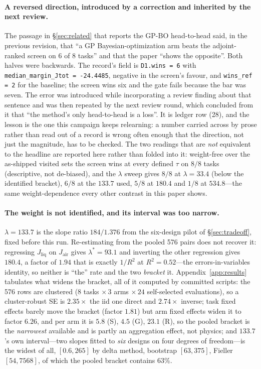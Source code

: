 \documentclass{article}
\newcommand{\Jliq}{J_{\mathrm{liq}}}
\newcommand{\Jair}{J_{\mathrm{air}}}
\begin{document}
\paragraph{A reversed direction, introduced by a correction and inherited by the next
review.}
The passage in \S\ref{sec:related} that reports the GP-BO head-to-head said, in the
previous revision, that ``a GP Bayesian-optimization arm beats the adjoint-ranked screen on
$6$ of $8$ tasks'' and that the paper ``shows the opposite''.  Both halves were backwards.
The record's field is \texttt{D1.wins = 6} with \texttt{median\_margin\_Jtot = -24.4485},
negative in the screen's favour, and \texttt{wins\_ref = 2} for the baseline; the screen
wins six and the gate fails because the bar was seven.  The error was introduced while
incorporating a review finding about that sentence and was then repeated by the next review
round, which concluded from it that ``the method's only head-to-head is a loss''.  It is
ledger row (28), and the lesson is the one this campaign keeps relearning: a number carried
across by prose rather than read out of a record is wrong often enough that the direction,
not just the magnitude, has to be checked.  The two readings that are \emph{not} equivalent
to the headline are reported here rather than folded into it: weight-free over the
as-shipped visited sets the screen wins at every defined $\tau$ on $8/8$ tasks (descriptive,
not de-biased), and the $\lambda$ sweep gives $8/8$ at $\lambda = 33.4$ (below the
identified bracket), $6/8$ at the $133.7$ used, $5/8$ at $180.4$ and $1/8$ at $534.8$---the
same weight-dependence every other contrast in this paper shows.



\paragraph{The weight is not identified, and its interval was too narrow.}
$\lambda = 133.7$ is the slope ratio $184/1.376$ from the six-design pilot of
\S\ref{sec:tradeoff}, fixed before this run.  Re-estimating from the pooled 576 pairs
does not recover it: regressing $\Jliq$ on $\Jair$ gives $\lambda^* = 93.1$ and inverting
the other regression gives $180.4$, a factor of $1.94$ that is exactly $1/R^2$ at
$R^2 = 0.52$---the errors-in-variables identity, so neither is ``the'' rate and the two
\emph{bracket} it.  Appendix~\ref{app:results} tabulates what widens the bracket, all of
it computed by committed scripts: the 576 rows are clustered ($8$ tasks $\times\,3$ arms
$\times\,24$ self-selected evaluations), so a cluster-robust SE is $2.35\times$ the iid
one direct and $2.74\times$ inverse; task fixed effects barely move the bracket (factor
$1.81$) but arm fixed effects widen it to factor $6.26$, and per arm it is $5.8$ (S),
$4.5$ (G), $23.1$ (R), so the pooled bracket is the \emph{narrowest} available and is
partly an aggregation effect, not physics; and $133.7$'s own interval---two slopes fitted
to \emph{six} designs on four degrees of freedom---is the widest of all, $[0.6, 265]$ by
delta method, bootstrap $[63, 375]$, Fieller $[54, 7568]$, of which the pooled bracket
contains $63\%$.
\end{document}
